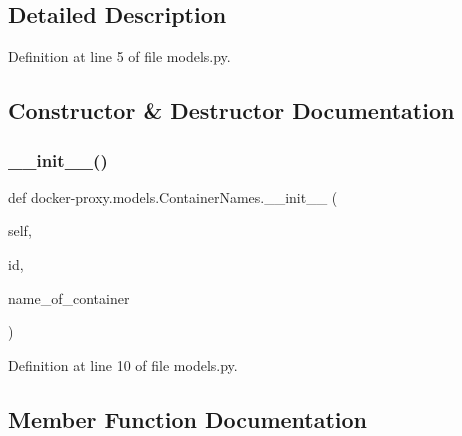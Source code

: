 \subsection{Detailed Description}


Definition at line 5 of file models.\+py.



\subsection{Constructor \& Destructor Documentation}
\hypertarget{classdocker-proxy_1_1models_1_1_container_names_a51208829bf52ae24f5cf5891f486731b}{}\label{classdocker-proxy_1_1models_1_1_container_names_a51208829bf52ae24f5cf5891f486731b} 
\subsubsection{\texorpdfstring{\+\_\+\+\_\+init\+\_\+\+\_\+()}{\_\_init\_\_()}}
{\footnotesize\ttfamily def docker-\/proxy.\+models.\+Container\+Names.\+\_\+\+\_\+init\+\_\+\+\_\+ (\begin{DoxyParamCaption}\item[{}]{self,  }\item[{}]{id,  }\item[{}]{name\+\_\+of\+\_\+container }\end{DoxyParamCaption})}



Definition at line 10 of file models.\+py.



\subsection{Member Function Documentation}
\hypertarget{classdocker-proxy_1_1models_1_1_container_names_a2b52c32297b1bb19f73687c9b21e5e50}{}\label{classdocker-proxy_1_1models_1_1_container_names_a2b52c32297b1bb19f73687c9b21e5e50} 
